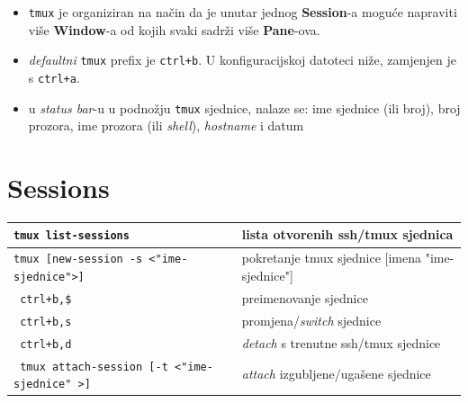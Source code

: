 \documentclass[10pt]{article}
\begin{document}
\renewcommand{\arraystretch}{1.50}

    \begin{itemize}
        \item \texttt{tmux} je organiziran na način da je unutar jednog \textbf{Session}-a moguće napraviti više \textbf{Window}-a od kojih svaki sadrži više \textbf{Pane}-ova.
        \item \textit{defaultni} \texttt{tmux} prefix je \texttt{ctrl+b}. U konfiguracijskoj datoteci niže, zamjenjen je s \texttt{ctrl+a}. 
        \item u \textit{status bar}-u u podnožju \texttt{tmux} sjednice, nalaze se: ime sjednice (ili broj), broj prozora, ime prozora (ili \textit{shell}), \textit{hostname} i datum
    \end{itemize}

    \section*{\color{ForestGreen} Sessions}
    \begin{tabular}{|>{\tt}p{9.00cm}|>{}p{15.50cm}|}
        \hline
        tmux list-sessions                          &   lista otvorenih ssh/tmux sjednica                   \\ \hline
        tmux [new-session -s <"ime-sjednice">]      &   pokretanje tmux sjednice [imena "ime-sjednice"]     \\ \hline
        ctrl+b,\$                                   &   preimenovanje sjednice                              \\ \hline
        ctrl+b,s                                    &   promjena/\textit{switch} sjednice                   \\ \hline
        ctrl+b,d                                    &   \textit{detach} s trenutne ssh/tmux sjednice        \\ \hline
        tmux attach-session [-t <"ime-sjednice" >]  &   \textit{attach} izgubljene/ugašene sjednice         \\ \hline
    \end{tabular}

\end{document}
